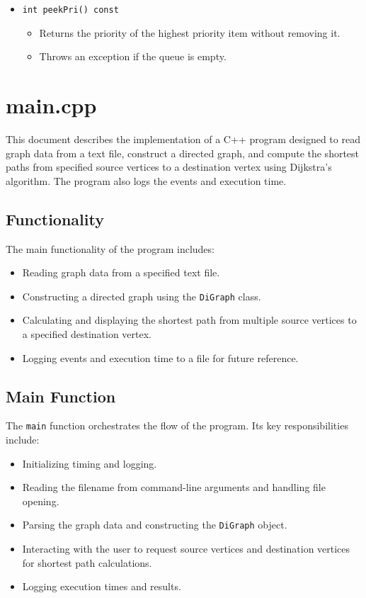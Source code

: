 \documentclass{article}
\begin{document}
\begin{itemize}
    \item \texttt{int peekPri() const}
    \begin{itemize}
        \item Returns the priority of the highest priority item without removing it.
        \item Throws an exception if the queue is empty.
    \end{itemize}
\end{itemize}

\section{main.cpp}
This document describes the implementation of a C++ program designed to read graph data from a text file, construct a directed graph, and compute the shortest paths from specified source vertices to a destination vertex using Dijkstra's algorithm. The program also logs the events and execution time.

\subsection{Functionality}
The main functionality of the program includes:
\begin{itemize}
    \item Reading graph data from a specified text file.
    \item Constructing a directed graph using the \texttt{DiGraph} class.
    \item Calculating and displaying the shortest path from multiple source vertices to a specified destination vertex.
    \item Logging events and execution time to a file for future reference.
\end{itemize}

\subsection{Main Function}
The \texttt{main} function orchestrates the flow of the program. Its key responsibilities include:
\begin{itemize}
    \item Initializing timing and logging.
    \item Reading the filename from command-line arguments and handling file opening.
    \item Parsing the graph data and constructing the \texttt{DiGraph} object.
    \item Interacting with the user to request source vertices and destination vertices for shortest path calculations.
    \item Logging execution times and results.
\end{itemize}
\end{document}
